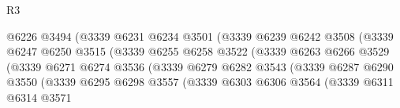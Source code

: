 \begin{lexlean}{R3}
\begin{coremodule}
                                        @6226
                                        @3494
                                        (@3339
                                          @6231
                                          @6234
                                          @3501
                                          (@3339
                                            @6239
                                            @6242
                                            @3508
                                            (@3339
                                              @6247
                                              @6250
                                              @3515
                                              (@3339
                                                @6255
                                                @6258
                                                @3522
                                                (@3339
                                                  @6263
                                                  @6266
                                                  @3529
                                                  (@3339
                                                    @6271
                                                    @6274
                                                    @3536
                                                    (@3339
                                                      @6279
                                                      @6282
                                                      @3543
                                                      (@3339
                                                        @6287
                                                        @6290
                                                        @3550
                                                        (@3339
                                                          @6295
                                                          @6298
                                                          @3557
                                                          (@3339
                                                            @6303
                                                            @6306
                                                            @3564
                                                            (@3339
                                                              @6311
                                                              @6314
                                                              @3571

\end{coremodule}
\end{lexlean}
